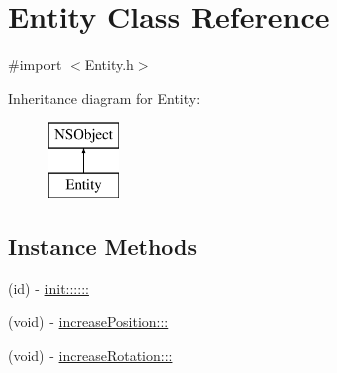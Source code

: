 \hypertarget{interface_entity}{}\section{Entity Class Reference}
\label{interface_entity}


{\ttfamily \#import $<$Entity.\+h$>$}

Inheritance diagram for Entity\+:\begin{figure}[H]
\begin{center}
\leavevmode
\includegraphics[height=2.000000cm]{interface_entity}
\end{center}
\end{figure}
\subsection*{Instance Methods}
\begin{DoxyCompactItemize}
\item 
(id) -\/ \hyperlink{interface_entity_ad7147d00332fed30cf14829243c5430e}{init\+::::::}
\item 
(void) -\/ \hyperlink{interface_entity_a51ba5b8f3b66cba0b722edaabdd6090e}{increase\+Position\+:::}
\item 
(void) -\/ \hyperlink{interface_entity_a6e21b02ee042d70378d336fe6ea16fb5}{increase\+Rotation\+:::}
\end{DoxyCompactItemize}
